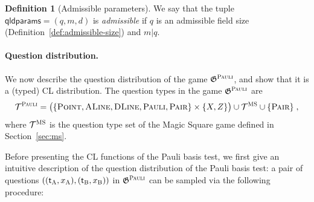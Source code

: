 \documentclass[11pt]{article}
\theoremstyle{definition}
\newtheorem{definition}[theorem]{Definition}
\newcommand{\game}{\mathfrak{G}}
\newcommand{\type}{\mathcal{T}}
\newcommand{\gamestyle}[1]{\ensuremath{\textsc{#1}}\xspace}
\newcommand{\ms}{\gamestyle{MS}}
\newcommand{\pauli}{\gamestyle{Pauli}}
\newcommand{\labelstyle}[1]{\ensuremath{\textsc{#1}}\xspace}
\newcommand{\tvarstyle}[1]{\mathsf{#1}}
\newcommand{\tvar}{\ensuremath{\tvarstyle{t}}}
\newcommand{\alice}{\labelstyle{A}}
\newcommand{\bob}{\labelstyle{B}}
\newcommand{\typestyle}[1]{\ensuremath{\textsc{#1}}\xspace}
\newcommand{\Point}{\typestyle{Point}}
\newcommand{\ALine}{\typestyle{ALine}}
\newcommand{\DLine}{\typestyle{DLine}}
\newcommand{\Pair}{\typestyle{Pair}}
\newcommand{\Pauli}{\typestyle{Pauli}}
\newcommand{\qldparams}{\mathsf{qldparams}}
\begin{document}
\begin{definition}[Admissible parameters]\label{def:admissible}
  We say that the tuple $\qldparams=(q, m, d)$ is \emph{admissible} if $q$ is
  an admissible field size (Definition~\ref{def:admissible-size}) and $m | q$.
\end{definition}


\paragraph{Question distribution.}
We now describe the question distribution of the game $\game^\pauli$, and show
that it is a (typed) CL distribution.
The question types in the game $\game^\pauli$ are
\begin{equation}
  \label{eq:pauli-type}
  \type^\pauli= \bigl( \{\Point, \ALine, \DLine, \Pauli, \Pair \} \times \{X,Z\} \bigr)
  \cup \type^\ms \cup \{\Pair\}\;,
\end{equation}
where $\type^\ms$ is the question type set of the Magic Square game defined in
Section~\ref{sec:ms}.




Before presenting the CL functions of the Pauli basis test, we first give an
intuitive description of the question distribution of the Pauli basis test: a
pair of questions $((\tvar_\alice, x_\alice), (\tvar_\bob, x_\bob))$ in
$\game^\pauli$ can be sampled via the following procedure:
\end{document}
